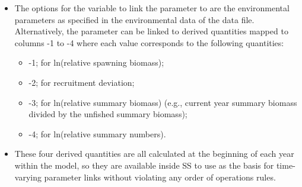 {\begin{itemize}
\begin{itemize}
\begin{itemize}
           \item $P_{base}$ = Base parameter value in year $y$
           \item $P_{t}$ = Time-varying parameter value
           \item $P_{t1}$ = First of 2 time-varying parameters (offset)
           \item $P_{t2}$ = Second of 2 time-varying parameters (slope)
           \item $E_{y}$ = Environmental index value in year $y$
           \item $min(P_{base})$ = the min parameter bound of base parameter
           \item $max(P_{base})$ = the max parameter bound of base parameter
        \end{itemize}
		\item The options for the variable to link the parameter to are the environmental parameters as specified in the environmental data of the data file. Alternatively, the parameter can be linked to derived quantities mapped to columns -1 to -4 where each value corresponds to the following quantities:
		\begin{itemize}
			\item -1;  for ln(relative spawning biomass);
			\item -2;  for recruitment deviation;
			\item -3;  for ln(relative summary biomass) (e.g., current year summary biomass divided by the unfished summary biomass);
			\item -4;  for ln(relative summary numbers).
		\end{itemize}
		\item These four derived quantities are all calculated at the beginning of each year within the model, so they are available inside SS to use as the basis for time-varying parameter links without violating any order of operations rules.
	\end{itemize}
	

\end{itemize}}
